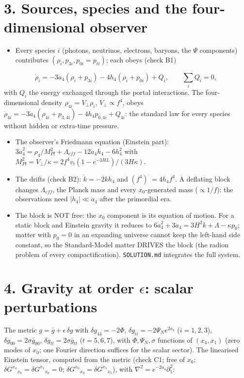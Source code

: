 \documentclass[11pt]{article}
\begin{document}
\section*{3. Sources, species and the four-dimensional observer}

\begin{itemize}
\item Every species $i$ (photons, neutrinos, electrons, baryons, the $\Psi$ components) contributes $(\rho_i, p_{3i}, p_{0i} = p_{ti})$; each obeys (check B1)
\end{itemize}
\[\dot\rho_i = -3\dot a_4(\rho_i + p_{3i}) - 4h_4(\rho_i + p_{0i}) + Q_i,\qquad \sum_i Q_i = 0,\]
with $Q_i$ the energy exchanged through the portal interactions. The four-dimensional density $\rho_{4i} = V_\perp\rho_i$, $V_\perp \propto f^4$, obeys $\dot\rho_{4i} = -3\dot a_4(\rho_{4i} + p_{3,4i}) - 4h_4 p_{0,4i} + Q_{4i}$: the standard law for every species without hidden or extra-time pressure.
\begin{itemize}
\item The observer's Friedmann equation (Einstein part): $3\dot a_4^2 = \rho_4/M_{Pl}^2 + \Lambda_{eff} - 12\dot a_4h_4 - 6h_4^2$ with $M_{Pl}^2 = V_\perp/\kappa = 2f^4v_t(1 - e^{-3HL})/(3H\kappa)$.
\item The drifts (check B2): $\dot k = -2kh_4$ and $(f^4)^\cdot = 4h_4f^4$. A deflating block changes $\Lambda_{eff}$, the Planck mass and every $x_0$-generated mass ($\propto 1/f$): the observations need $|h_4| \ll \dot a_4$ after the primordial era.
\item The block is NOT free: the $x_0$ component is its equation of motion. For a static block and Einstein gravity it reduces to $6\dot a_4^2 + 3\ddot a_4 = 3H^2k + \Lambda - \kappa p_0$; matter with $p_0 = 0$ in an expanding universe cannot keep the left-hand side constant, so the Standard-Model matter DRIVES the block (the radion problem of every compactification). \texttt{SOLUTION.\allowbreak{}md} integrates the full system.
\end{itemize}

\section*{4. Gravity at order $\epsilon$: scalar perturbations}

The metric $g = \bar g + \epsilon\,\delta g$ with $\delta g_{44} = -2\Phi$, $\delta g_{ii} = -2\Psi_Ne^{2a_4}$ ($i = 1, 2, 3$), $\delta g_{00} = 2\sigma\bar g_{00}$, $\delta g_{tt} = 2\sigma\bar g_{tt}$ ($t = 5, 6, 7$), with $\Phi, \Psi_N, \sigma$ functions of $(x_4, x_1)$ (zero modes of $x_0$; one Fourier direction suffices for the scalar sector). The linearised Einstein tensor, computed from the metric (check C1; free of $x_0$; $\delta G^{x_4}{}_{x_0} = \delta G^{x_1}{}_{x_0} = 0$; $\delta G^{x_0}{}_{x_0} = \delta G^{x_5}{}_{x_5}$), with $\nabla^2 = e^{-2a_4}\partial_1^2$:
\end{document}
